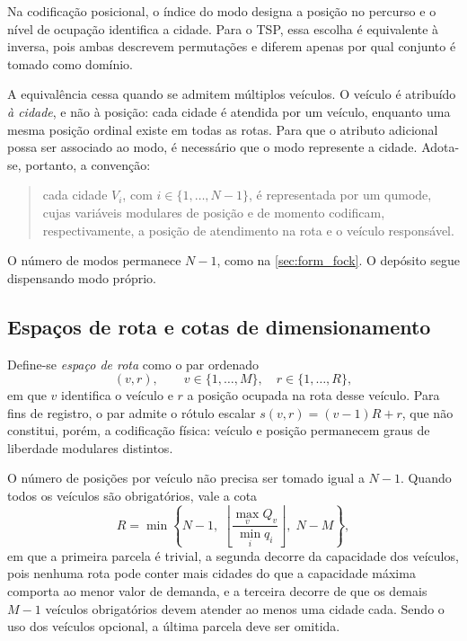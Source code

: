         Na codificação posicional, o índice do modo designa a posição no percurso e o nível de ocupação identifica a cidade. Para o TSP, essa escolha é equivalente à inversa, pois ambas descrevem permutações e diferem apenas por qual conjunto é tomado como domínio.

        A equivalência cessa quando se admitem múltiplos veículos. O veículo é atribuído \emph{à cidade}, e não à posição: cada cidade é atendida por um veículo, enquanto uma mesma posição ordinal existe em todas as rotas. Para que o atributo adicional possa ser associado ao modo, é necessário que o modo represente a cidade. Adota-se, portanto, a convenção:

        \begin{quote}
            cada cidade $V_i$, com $i \in \{1, \dots, N-1\}$, é representada por um qumode, cujas variáveis modulares de posição e de momento codificam, respectivamente, a posição de atendimento na rota e o veículo responsável.
        \end{quote}

        O número de modos permanece $N-1$, como na \autoref{sec:form_fock}. O depósito segue dispensando modo próprio.

    \subsection{Espaços de rota e cotas de dimensionamento}\label{subsec:form_mod_slots}

        Define-se \emph{espaço de rota} como o par ordenado
        \begin{equation}\label{eq:form_mod_slot}
            (v, r), \qquad v \in \{1, \dots, M\}, \quad r \in \{1, \dots, R\} ,
        \end{equation}
        \noindent em que $v$ identifica o veículo e $r$ a posição ocupada na rota desse veículo. Para fins de registro, o par admite o rótulo escalar $s(v,r) = (v-1)R + r$, que não constitui, porém, a codificação física: veículo e posição permanecem graus de liberdade modulares distintos.

        O número de posições por veículo não precisa ser tomado igual a $N-1$. Quando todos os veículos são obrigatórios, vale a cota
        \begin{equation}\label{eq:form_mod_R}
            R = \min\left\{ N-1, \;
            \left\lfloor \frac{\max_v Q_v}{\min_i q_i} \right\rfloor, \;
            N - M \right\} ,
        \end{equation}
        \noindent em que a primeira parcela é trivial, a segunda decorre da capacidade dos veículos, pois nenhuma rota pode conter mais cidades do que a capacidade máxima comporta ao menor valor de demanda, e a terceira decorre de que os demais $M-1$ veículos obrigatórios devem atender ao menos uma cidade cada. Sendo o uso dos veículos opcional, a última parcela deve ser omitida.

